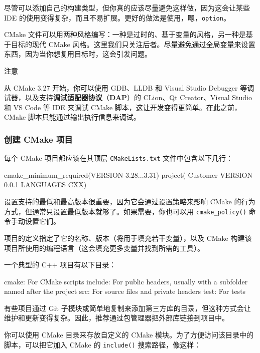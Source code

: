 尽管可以添加自己的构建类型，但你真的应该尽量避免这样做，因为这会让某些 IDE 的使用变得复杂，而且不易扩展。更好的做法是使用，嗯，\texttt{option}。

\label{idx:660}
CMake 文件可以用两种风格编写：一种是过时的、基于变量的风格，另一种是基于目标的现代 CMake 风格。这里我们只关注后者。尽量避免通过全局变量来设置东西，因为当你想复用目标时，这会引发问题。

\begin{myNotic}{注意}

从 CMake 3.27 开始，你可以使用 GDB、LLDB 和 Visual Studio Debugger 等调试器，以及支持\textbf{调试适配器协议}（\textbf{DAP}）的 CLion、Qt Creator、Visual Studio 和 VS Code 等 IDE 来调试 CMake 脚本，这让开发变得更简单。在此之前，CMake 脚本只能通过输出执行信息来调试。
\end{myNotic}

\subsubsection{创建 CMake 项目}

\label{idx:661}
每个 CMake 项目都应该在其顶层 \texttt{CMake\allowbreak{}Lists.\allowbreak{}txt} 文件中包含以下几行：

\begin{codebox}[cmake]
cmake_minimum_required(VERSION 3.28...3.31)
project(
  Customer
  VERSION 0.0.1
  LANGUAGES CXX)
\end{codebox}

设置支持的最低和最高版本很重要，因为它会通过设置策略来影响 CMake 的行为方式，但通常只设置最低版本就够了。如果需要，你也可以用 \texttt{cmake\_\allowbreak{}policy(\allowbreak{})\allowbreak{}} 命令手动设置它们。

项目的定义指定了它的名称、版本（将用于填充若干变量），以及 CMake 构建该项目所使用的编程语言（这会填充更多变量并找到所需的工具）。

一个典型的 C++ 项目有以下目录：

\begin{codebox}[yaml]
cmake: For CMake scripts
include: For public headers, usually with a subfolder named after the project
src: For source files and private headers
test: For tests
\end{codebox}

\label{idx:662}
有些项目通过 Git 子模块或简单地复制来添加第三方库的目录，但这种方式会让维护和更新变得复杂。因此，推荐通过包管理器把外部库链接到项目中。

你可以使用 CMake 目录来存放自定义的 CMake 模块。为了方便访问该目录中的脚本，可以把它加入 CMake 的 \texttt{include()} 搜索路径，像这样：

